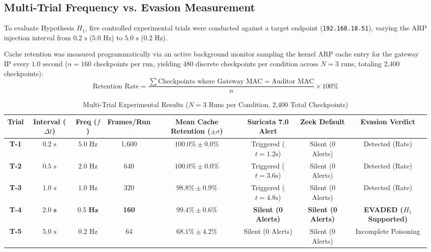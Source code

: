 \documentclass[conference]{IEEEtran}
\begin{document}
\subsection{Multi-Trial Frequency vs. Evasion Measurement}
To evaluate Hypothesis $H_1$, five controlled experimental trials were conducted against a target endpoint (\texttt{192.168.18.51}), varying the ARP injection interval from $0.2\text{ s}$ ($5.0\text{ Hz}$) to $5.0\text{ s}$ ($0.2\text{ Hz}$).

Cache retention was measured programmatically via an active background monitor sampling the kernel ARP cache entry for the gateway IP every $1.0\text{ second}$ ($n = 160$ checkpoints per run, yielding 480 discrete checkpoints per condition across $N = 3$ runs, totaling 2,400 checkpoints):
\begin{equation}
\text{Retention Rate} = \frac{\sum \text{Checkpoints where Gateway MAC} = \text{Auditor MAC}}{n} \times 100\%
\end{equation}

\begin{table}[t]
\caption{Multi-Trial Experimental Results ($N=3$ Runs per Condition, 2,400 Total Checkpoints)}
\label{tab:trials}
\centering
\begin{tabular}{@{}cccccccc@{}}
\toprule
\textbf{Trial} & \textbf{Interval ($\Delta t$)} & \textbf{Freq ($f$)} & \textbf{Frames/Run} & \textbf{Mean Cache Retention ($\pm \sigma$)} & \textbf{Suricata 7.0 Alert} & \textbf{Zeek Default} & \textbf{Evasion Verdict} \\ \midrule
\textbf{T-1} & $0.2\text{ s}$ & $5.0\text{ Hz}$ & 1,600 & $100.0\% \pm 0.0\%$ & Triggered ($t = 1.2\text{s}$) & Silent (0 Alerts) & Detected (Rate) \\
\textbf{T-2} & $0.5\text{ s}$ & $2.0\text{ Hz}$ & 640 & $100.0\% \pm 0.0\%$ & Triggered ($t = 3.6\text{s}$) & Silent (0 Alerts) & Detected (Rate) \\
\textbf{T-3} & $1.0\text{ s}$ & $1.0\text{ Hz}$ & 320 & $98.8\% \pm 0.9\%$ & Triggered ($t = 4.8\text{s}$) & Silent (0 Alerts) & Detected (Rate) \\
\textbf{T-4} & $\mathbf{2.0\text{ s}}$ & $\mathbf{0.5\text{ Hz}}$ & \textbf{160} & $\mathbf{99.4\% \pm 0.6\%}$ & \textbf{Silent (0 Alerts)} & \textbf{Silent (0 Alerts)} & \textbf{EVADED ($H_1$ Supported)} \\
\textbf{T-5} & $5.0\text{ s}$ & $0.2\text{ Hz}$ & 64 & $68.1\% \pm 4.2\%$ & Silent (0 Alerts) & Silent (0 Alerts) & Incomplete Poisoning \\ \bottomrule
\end{tabular}
\end{table}
\end{document}
